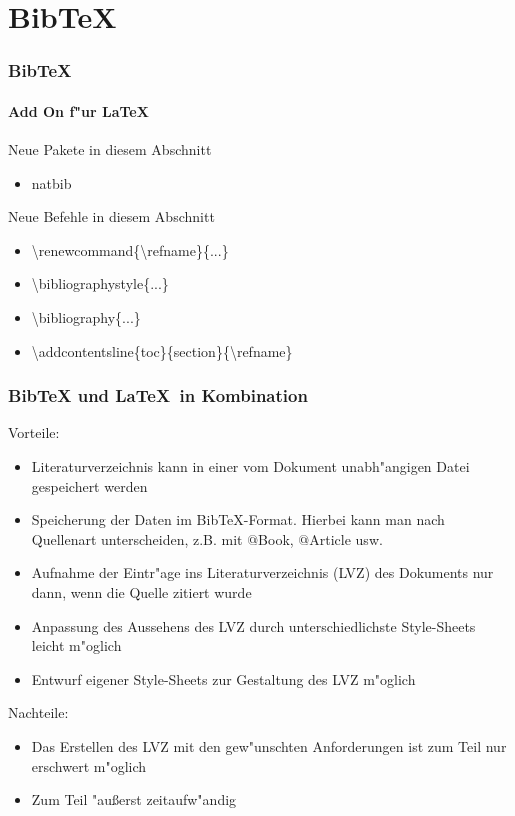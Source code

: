 \section{BibTeX}
\begin{frame}
\frametitle{BibTeX}
\framesubtitle{Add On f"ur \LaTeX}
\begin{exampleblock}{Neue Pakete in diesem Abschnitt}
\begin{itemize}
\item natbib
\end{itemize}
\end{exampleblock}

\begin{block}{Neue Befehle in diesem Abschnitt}
\begin{itemize}
\item \color{nounibaredI}\textbackslash renewcommand\color{black}\{\color{nounibaredI}\textbackslash refname\color{black}\}\{...\}
\item \color{nounibaredI}\textbackslash bibliographystyle\color{black}\{...\}
\item \color{nounibaredI}\textbackslash bibliography\color{black}\{...\}
\item \color{nounibaredI}\textbackslash addcontentsline\color{black}\{toc\}\{section\}\{\color{nounibaredI}\textbackslash refname\color{black}\}
\end{itemize}
\end{block}
\end{frame}

\begin{frame}
\frametitle{BibTeX und \LaTeX ~in Kombination}
Vorteile:
\begin{itemize}
\item Literaturverzeichnis kann in einer vom Dokument unabh"angigen Datei gespeichert werden
\item Speicherung der Daten im BibTeX-Format. Hierbei kann man nach Quellenart unterscheiden, z.B. mit $@$Book, $@$Article usw.
\item Aufnahme der Eintr"age ins Literaturverzeichnis (LVZ) des Dokuments nur dann, wenn die Quelle zitiert wurde
\item Anpassung des Aussehens des LVZ durch unterschiedlichste Style-Sheets leicht m"oglich 
\item Entwurf eigener Style-Sheets zur Gestaltung des LVZ m"oglich
\end{itemize}
Nachteile:
\begin{itemize}
\item Das Erstellen des LVZ mit den gew"unschten Anforderungen ist zum Teil nur erschwert m"oglich
\item Zum Teil "au\ss erst zeitaufw"andig
\end{itemize}
\end{frame}

